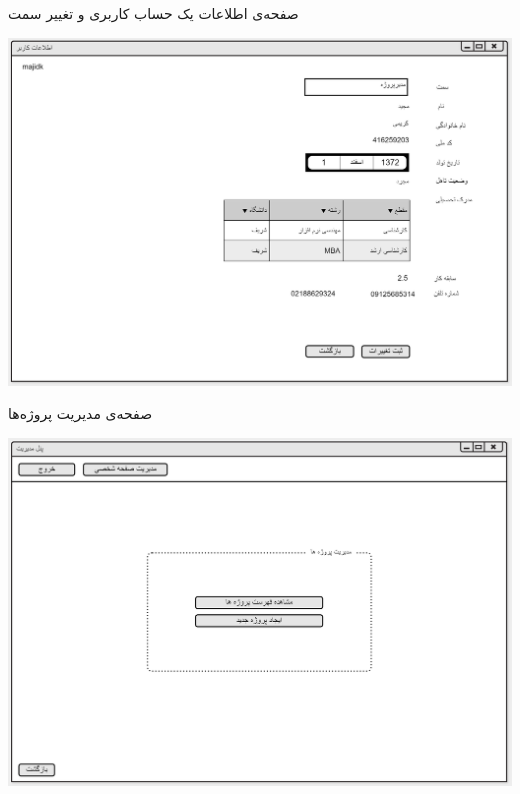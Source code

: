 \documentclass{article}
\begin{document}
\newpage
\vspace{1cm}
صفحه‌ی اطلاعات یک حساب کاربری و تغییر سمت 
\begin{center}
\includegraphics[width=\textwidth]{Prototype/HeadManager/ChangePosition.png}
\end{center}

\newpage
\vspace{1cm}
صفحه‌ی مدیریت پروژه‌ها
\begin{center}
\includegraphics[width=\textwidth]{Prototype/HeadManager/ProjectsManagement.png}
\end{center}
\end{document}
